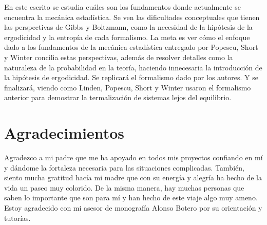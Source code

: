 \documentclass[11pt]{book}
\theoremstyle{definition}
\begin{document}
\vspace*{4em}

En este escrito se estudia cuáles son los fundamentos donde actualmente se encuentra la mecánica estadística. Se ven las dificultades conceptuales que tienen las perspectivas de Gibbs y Boltzmann, como la necesidad de la hipótesis de la ergodicidad y la entropía de cada formalismo. La meta es ver cómo el enfoque dado a los fundamentos de la mecánica estadística entregado por Popescu, Short y Winter \cite{Popescu2006} concilia estas perspectivas, además de resolver detalles como la naturaleza de la probabilidad en la teoría, haciendo innecesaria la introducción de la hipótesis de ergodicidad. Se replicará el formalismo dado por los autores. Y se finalizará, viendo como Linden, Popescu, Short y Winter \cite{LindenPaper} usaron el formalismo anterior para demostrar la termalización de sistemas lejos del equilibrio.





\chapter*{Agradecimientos}
Agradezco a mi padre que me ha apoyado en todos mis proyectos confiando en mí y dándome la fortaleza necesaria para las situaciones complicadas. También, siento mucha gratitud hacía mi madre que con su energía y alegría ha hecho de la vida un paseo muy colorido. De la misma manera, hay muchas personas que saben lo importante que son para mí y han hecho de este viaje algo muy ameno. Estoy agradecido con mi asesor de monografía Alonso Botero por su orientación y tutorías.






\end{document}
